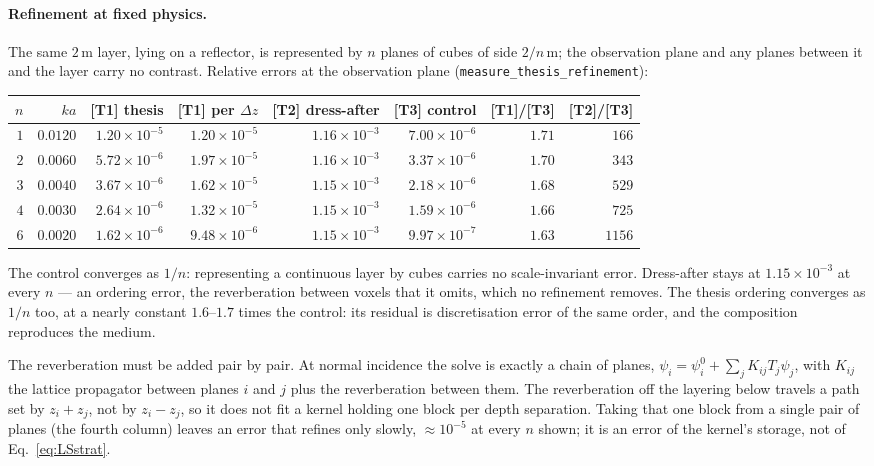 \documentclass[11pt,a4paper]{article}
\begin{document}
\paragraph{Refinement at fixed physics.} The same $2$\,m layer, lying on a reflector, is
represented by $n$ planes of cubes of side $2/n$\,m; the observation plane and any planes between it
and the layer carry no contrast. Relative errors at the observation plane
(\texttt{measure\_thesis\_refinement}):
\begin{center}
\small\setlength{\tabcolsep}{4pt}\begin{tabular}{@{}rrrrrrrr@{}}
\toprule
$n$ & $ka$ & [T1] thesis & [T1] per $\Delta z$ & [T2] dress-after & [T3] control & [T1]/[T3] & [T2]/[T3]\\
\midrule
$1$ & $0.0120$ & $1.20\times10^{-5}$ & $1.20\times10^{-5}$ & $1.16\times10^{-3}$ & $7.00\times10^{-6}$ & $1.71$ & $166$\\
$2$ & $0.0060$ & $5.72\times10^{-6}$ & $1.97\times10^{-5}$ & $1.16\times10^{-3}$ & $3.37\times10^{-6}$ & $1.70$ & $343$\\
$3$ & $0.0040$ & $3.67\times10^{-6}$ & $1.62\times10^{-5}$ & $1.15\times10^{-3}$ & $2.18\times10^{-6}$ & $1.68$ & $529$\\
$4$ & $0.0030$ & $2.64\times10^{-6}$ & $1.32\times10^{-5}$ & $1.15\times10^{-3}$ & $1.59\times10^{-6}$ & $1.66$ & $725$\\
$6$ & $0.0020$ & $1.62\times10^{-6}$ & $9.48\times10^{-6}$ & $1.15\times10^{-3}$ & $9.97\times10^{-7}$ & $1.63$ & $1156$\\
\bottomrule
\end{tabular}
\end{center}
The control converges as $1/n$: representing a continuous layer by cubes carries no scale-invariant
error. Dress-after stays at $1.15\times10^{-3}$ at every $n$ --- an ordering error, the reverberation
between voxels that it omits, which no refinement removes. The thesis ordering converges as $1/n$
too, at a nearly constant $1.6$--$1.7$ times the control: its residual is discretisation error of the
same order, and the composition reproduces the medium.

The reverberation must be added pair by pair. At normal incidence the solve is exactly a chain of
planes, $\psi_i = \psi^0_i + \sum_j K_{ij} T_j \psi_j$, with $K_{ij}$ the lattice propagator between
planes $i$ and $j$ plus the reverberation between them. The reverberation off the layering below
travels a path set by $z_i + z_j$, not by $z_i - z_j$, so it does not fit a kernel holding one block
per depth separation. Taking that one block from a single pair of planes (the fourth column) leaves an
error that refines only slowly, ${\approx}10^{-5}$ at every $n$ shown; it is an error of the kernel's
storage, not of Eq.~\eqref{eq:LSstrat}.
\end{document}
